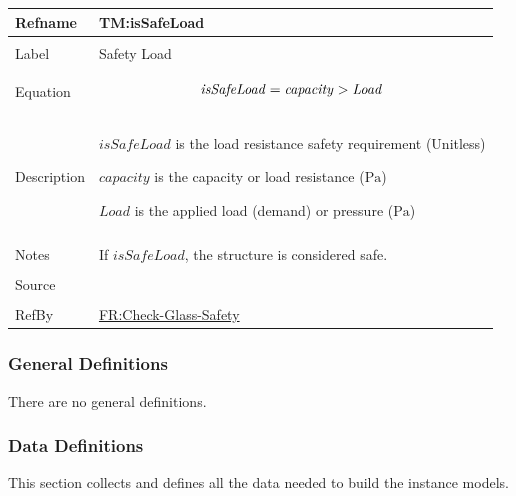 \documentclass[12pt]{article}
\newcommand{\gt}{\ensuremath >}
\begin{document}
\begin{minipage}{\textwidth}
\begin{tabular}{>{\raggedright}p{}>{\raggedright\arraybackslash}p{}}
\toprule \textbf{Refname} & \textbf{TM:isSafeLoad}
\label{TM:isSafeLoad}
\\ \midrule \\
Label & Safety Load
        
\\ \midrule \\
Equation & \begin{displaymath}
           \mathit{isSafeLoad}=\mathit{capacity}\gt{}\mathit{Load}
           \end{displaymath}
\\ \midrule \\
Description & \begin{symbDescription}
              \item{$\mathit{isSafeLoad}$ is the load resistance safety requirement (Unitless)}
              \item{$\mathit{capacity}$ is the capacity or load resistance (${\text{Pa}}$)}
              \item{$\mathit{Load}$ is the applied load (demand) or pressure (${\text{Pa}}$)}
              \end{symbDescription}
\\ \midrule \\
Notes & If $\mathit{isSafeLoad}$, the structure is considered safe.
        
\\ \midrule \\
Source & \cite{astm2009}
         
\\ \midrule \\
RefBy & \hyperref[checkGlassSafety]{FR:Check-Glass-Safety}
        
\\ \bottomrule
\end{tabular}
\end{minipage}
\subsubsection{General Definitions}
\label{Sec:GDs}
There are no general definitions.

\subsubsection{Data Definitions}
\label{Sec:DDs}
This section collects and defines all the data needed to build the instance models.
\end{document}
